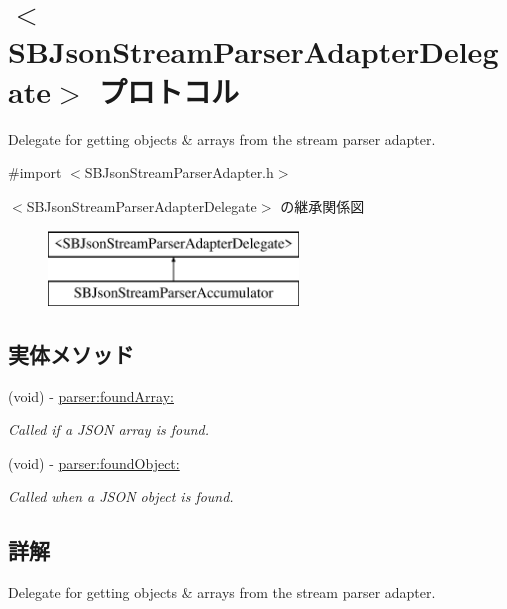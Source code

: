 \hypertarget{protocol_s_b_json_stream_parser_adapter_delegate-p}{}\section{$<$S\+B\+Json\+Stream\+Parser\+Adapter\+Delegate$>$ プロトコル}
\label{protocol_s_b_json_stream_parser_adapter_delegate-p}


Delegate for getting objects \& arrays from the stream parser adapter.  




{\ttfamily \#import $<$S\+B\+Json\+Stream\+Parser\+Adapter.\+h$>$}

$<$S\+B\+Json\+Stream\+Parser\+Adapter\+Delegate$>$ の継承関係図\begin{figure}[H]
\begin{center}
\leavevmode
\includegraphics[height=2.000000cm]{protocol_s_b_json_stream_parser_adapter_delegate-p}
\end{center}
\end{figure}
\subsection*{実体メソッド}
\begin{DoxyCompactItemize}
\item 
(void) -\/ \hyperlink{protocol_s_b_json_stream_parser_adapter_delegate-p_acac3b4b2e4cfb45a8ca8ca945a47e326}{parser\+:found\+Array\+:}
\begin{DoxyCompactList}\small\item\em Called if a J\+S\+O\+N array is found. \end{DoxyCompactList}\item 
(void) -\/ \hyperlink{protocol_s_b_json_stream_parser_adapter_delegate-p_abefd538a1ce6d75eb3e8572a1049f597}{parser\+:found\+Object\+:}
\begin{DoxyCompactList}\small\item\em Called when a J\+S\+O\+N object is found. \end{DoxyCompactList}\end{DoxyCompactItemize}


\subsection{詳解}
Delegate for getting objects \& arrays from the stream parser adapter. 

